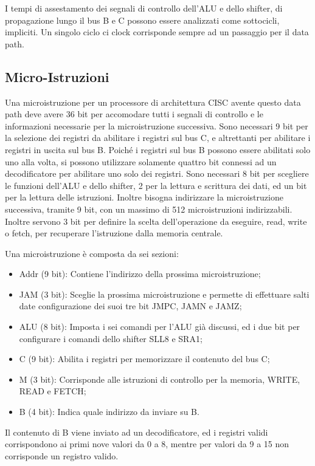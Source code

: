 \documentclass{article}
\numberwithin{equation}{subsection}
\begin{document}
I tempi di assestamento dei segnali di controllo dell'ALU e dello shifter, di propagazione lungo il bus B e C possono essere analizzati come sottocicli, impliciti. 
Un singolo ciclo ci clock corrisponde sempre ad un passaggio per il data path. 

\subsection{Micro-Istruzioni}

Una microistruzione per un processore di architettura CISC avente questo data path deve avere 36 bit per accomodare tutti i segnali di controllo e le informazioni necessarie per la 
microistruzione successiva. 
Sono necessari 9 bit per la selezione dei registri da abilitare i registri sul bus C, e altrettanti per abilitare i registri in uscita sul bus B. Poiché i registri sul bus B possono essere 
abilitati solo uno alla volta, si possono utilizzare solamente quattro bit connessi ad un decodificatore per abilitare uno solo dei registri. 
Sono necessari 8 bit per scegliere le funzioni dell'ALU e dello shifter, 2 per la lettura e scrittura dei dati, ed un bit per la lettura delle istruzioni. 
Inoltre bisogna indirizzare la microistruzione successiva, tramite 9 bit, con un massimo di 512 microistruzioni indirizzabili. Inoltre servono 3 bit per definire la scelta dell'operazione 
da eseguire, read, write o fetch, per recuperare l'istruzione dalla memoria centrale.  


Una microistruzione è composta da sei sezioni:
\begin{itemize}
    \item Addr (9 bit): Contiene l'indirizzo della prossima microistruzione;
    \item JAM (3 bit): Sceglie la prossima microistruzione e permette di effettuare salti date configurazione dei suoi tre bit JMPC, JAMN e JAMZ;
    \item ALU (8 bit): Imposta i sei comandi per l'ALU già discussi, ed i due bit per configurare i comandi dello shifter SLL8 e SRA1;
    \item C (9 bit): Abilita i registri per memorizzare il contenuto del bus C;
    \item M (3 bit): Corrisponde alle istruzioni di controllo per la memoria, WRITE, READ e FETCH;
    \item B (4 bit): Indica quale indirizzo da inviare su B. 
\end{itemize}

Il contenuto di B viene inviato ad un decodificatore, ed i registri validi corrispondono ai primi nove valori da 0 a 8, mentre per valori da 9 a 15 non corrisponde un registro valido. 
\end{document}

